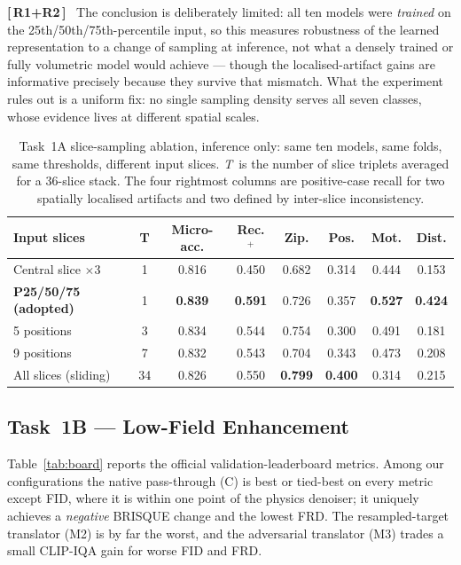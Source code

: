 \documentclass[runningheads]{llncs}
\newenvironment{revblock}[2]{\par\color{#1}\noindent\textbf{[\,#2\,]}\ \ignorespaces}{\par}
\begin{document}
\begin{revblock}{revboth}{R1+R2}
The conclusion is deliberately limited: all ten models were \emph{trained} on the
25th/50th/75th-percentile input, so this measures robustness of the learned
representation to a change of sampling at inference, not what a densely trained or
fully volumetric model would achieve --- though the localised-artifact gains are
informative precisely because they survive that mismatch. What the experiment rules
out is a uniform fix: no single sampling density serves all seven classes, whose
evidence lives at different spatial scales.

\begin{table}[!htbp]
\caption{Task~1A slice-sampling ablation, inference only: same ten models, same folds,
same thresholds, different input slices. \emph{T}\ is the number of slice triplets
averaged for a 36-slice stack. The four rightmost columns are positive-case recall for
two spatially localised artifacts and two defined by inter-slice inconsistency.}
\label{tab:slice}
\centering
\setlength{\tabcolsep}{4pt}
\footnotesize
\begin{tabular}{lccccccc}
\toprule
Input slices & T & Micro-acc. & Rec.$^{+}$ & Zip. & Pos. & Mot. & Dist. \\
\midrule
Central slice $\times3$    &  1 & 0.816 & 0.450 & 0.682 & 0.314 & 0.444 & 0.153 \\
\textbf{P25/50/75 (adopted)} &  1 & \textbf{0.839} & \textbf{0.591} & 0.726 & 0.357
  & \textbf{0.527} & \textbf{0.424} \\
5 positions                &  3 & 0.834 & 0.544 & 0.754 & 0.300 & 0.491 & 0.181 \\
9 positions                &  7 & 0.832 & 0.543 & 0.704 & 0.343 & 0.473 & 0.208 \\
All slices (sliding)       & 34 & 0.826 & 0.550 & \textbf{0.799} & \textbf{0.400}
  & 0.314 & 0.215 \\
\bottomrule
\end{tabular}
\end{table}

\end{revblock}

\subsection{Task~1B --- Low-Field Enhancement}
\label{sec:r1b}

Table~\ref{tab:board} reports the official validation-leaderboard metrics.
Among our configurations the native pass-through (C) is best or tied-best on
every metric except FID, where it is within one point of the physics denoiser; it
uniquely achieves a \emph{negative} BRISQUE change and the lowest FRD. The
resampled-target translator (M2) is by far the worst, and the adversarial
translator (M3) trades a small CLIP-IQA gain for worse FID and FRD.
\end{document}
